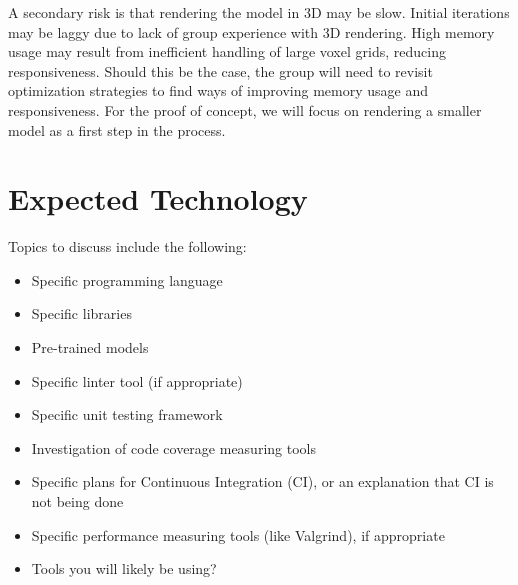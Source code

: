 \documentclass{article}
\begin{document}
A secondary risk is that rendering the model in 3D may be slow. Initial iterations may be laggy 
due to lack of group experience with 3D rendering. High memory usage may result from 
inefficient handling of large voxel grids, reducing responsiveness. Should this be 
the case, the group will need to revisit optimization strategies to find ways of 
improving memory usage and responsiveness. For the proof of concept, we will focus on 
rendering a smaller model as a first step in the process.

\section{Expected Technology}

\iffalse
{}


Topics to discuss include the following:

\begin{itemize}
\item Specific programming language
\item Specific libraries
\item Pre-trained models
\item Specific linter tool (if appropriate)
\item Specific unit testing framework
\item Investigation of code coverage measuring tools
\item Specific plans for Continuous Integration (CI), or an explanation that CI
  is not being done
\item Specific performance measuring tools (like Valgrind), if
  appropriate
\item Tools you will likely be using?
\end{itemize}
\end{document}
